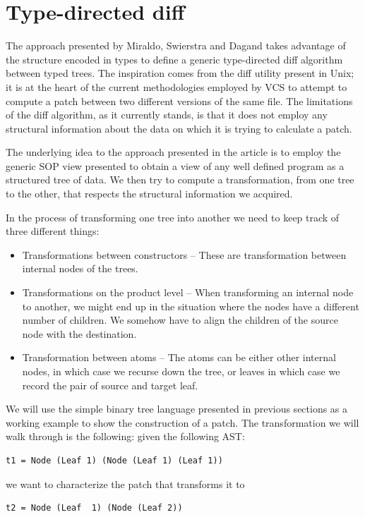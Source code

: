\documentclass[11pt, titlepage]{article}
\begin{document}
\section{Type-directed diff}\label{type-directed-diff}

The approach presented by Miraldo, Swierstra and Dagand \cite{type-directed-diff} takes advantage of the structure encoded in types to define a generic type-directed diff algorithm between typed trees. 
The inspiration comes from the diff utility present in Unix; it is at the heart of the current methodologies employed by VCS to attempt to compute a patch between two different versions of the same file. 
The limitations of the diff algorithm, as it currently stands, is that it does not employ any structural information about the data on which it is trying to calculate a patch. 

The underlying idea to the approach presented in the article is to employ
the generic SOP view presented to obtain a view of any well defined program as a structured tree of data.  
We then try to compute a transformation, from one tree to the other, that respects the structural information we acquired.

In the process of transforming one tree into another we need to keep track of three different things: 
\begin{itemize}
  \item Transformations between constructors -- These are transformation between internal nodes of the trees.
  \item Transformations on the product level -- When transforming an internal node to another, we might end up in the situation where the nodes have a different number of children. We somehow have to align the children of the source node with the destination.
  \item Transformation between atoms -- The atoms can be either other internal nodes, in which case we recurse down the tree, or leaves in which case we record the pair of source and target leaf.
\end{itemize}

We will use the simple binary tree language presented in previous sections as a 
working example to show the construction of a patch. The transformation we will walk through is the following:
given the following AST:
\begin{verbatim}
t1 = Node (Leaf 1) (Node (Leaf 1) (Leaf 1))
\end{verbatim}
we want to characterize the patch that transforms it to 
\begin{verbatim}
t2 = Node (Leaf  1) (Node (Leaf 2))
\end{verbatim}
\end{document}
